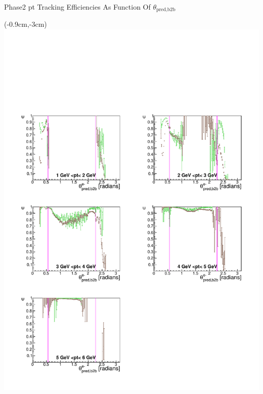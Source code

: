\documentclass[8pt]{beamer}
\begin{document}
\begin{frame}{Phase2 pt Tracking Efficiencies As Function Of $\theta_{\textrm{pred,b2b}}$}
	
	
	\begin{textblock*}{6.5cm}(-0.9cm,-3cm)
		\includegraphics[width=\textwidth]{VPlots/P2/xPtMThetaem}
	\end{textblock*}
	

\end{frame}
\end{document}
